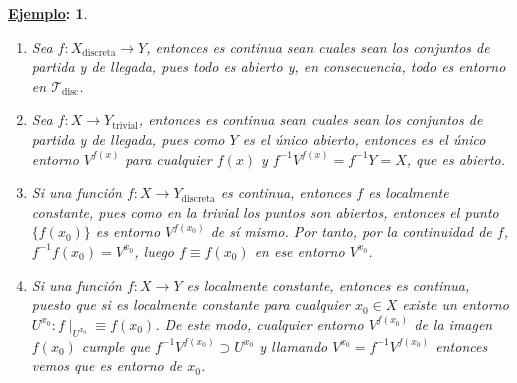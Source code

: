 \documentclass[10pt,a4paper,openright]{book}
\theoremstyle{break}
\newtheorem*{ej}{\underline{Ejemplo}:}
\begin{document}
\begin{ej}
\begin{enumerate}
    \item Sea $f: X_{\text{discreta}} \rightarrow Y$, entonces es continua sean cuales sean los conjuntos de partida y de llegada, pues todo es abierto y, en consecuencia, todo es entorno en $\mathcal{T}_{\text{disc}}$.
    \item Sea $f: X \rightarrow Y_{\text{trivial}}$, entonces es continua sean cuales sean los conjuntos de partida y de llegada, pues como $Y$ es el único abierto, entonces es el único entorno $V^{f\left( x \right)}$ para cualquier $f(x)$ y $f^{-1}V^{f\left( x \right)} = f^{-1}Y = X$, que es abierto.
    \item Si una función $f: X \rightarrow Y_{\text{discreta}}$ es continua, entonces $f$ es localmente constante, pues como en la trivial los puntos son abiertos, entonces el punto $\{f\left( x_0 \right)\}$ es entorno $V^{f\left( x_0 \right)}$ de sí mismo. Por tanto, por la continuidad de $f$, $f^{-1}f\left( x_0 \right) = V^{x_0}$, luego $f \equiv f\left( x_0 \right)$ en ese entorno $V^{x_0}$.
    \item Si una función $f: X \rightarrow Y$ es localmente constante, entonces es continua, puesto que si es localmente constante para cualquier $x_0 \in X$ existe un entorno $U^{x_0} : f\mid_{U^{x_0}} \equiv f\left( x_0 \right)$. De este modo, cualquier entorno $V^{f\left( x_0 \right)}$ de la imagen $f(x_0)$ cumple que $f^{-1}V^{f\left( x_0 \right)} \supset U^{x_0}$ y llamando $V^{x_0} = f^{-1} V^{f\left( x_0 \right)}$ entonces vemos que es entorno de $x_0$.
\end{enumerate}
\end{ej}
\end{document}
